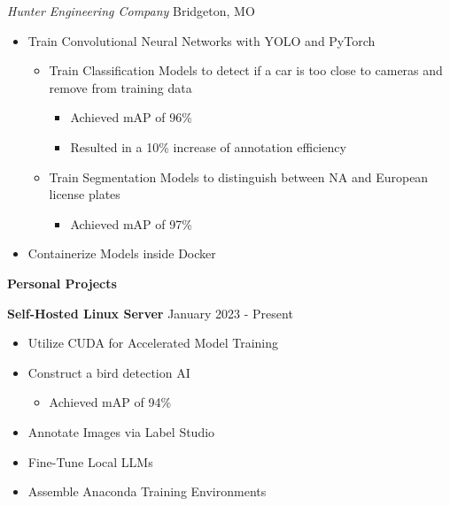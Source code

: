 \documentclass[11pt]{article}
\begin{document}
\textsl{Hunter Engineering Company} \hfill Bridgeton, MO
\begin{itemize}[noitemsep, topsep=0pt, partopsep=0pt, parsep=0pt, itemsep=0pt]
    \item Train Convolutional Neural Networks with YOLO and PyTorch
    \begin{itemize}[noitemsep, topsep=0pt, partopsep=0pt, parsep=0pt, itemsep=0pt]
        \item Train Classification Models to detect if a car is too close to cameras and remove from training data
        \begin{itemize}[noitemsep, topsep=0pt, partopsep=0pt, parsep=0pt, itemsep=0pt]
            \item Achieved mAP of 96\%
            \item Resulted in a 10\% increase of annotation efficiency
        \end{itemize}
        \item Train Segmentation Models to distinguish between NA and European license plates
        \begin{itemize}[noitemsep, topsep=0pt, partopsep=0pt, parsep=0pt, itemsep=0pt]
            \item Achieved mAP of 97\%
        \end{itemize}
    \end{itemize}
    \item Containerize Models inside Docker
\end{itemize}


\begin{center}
    \textbf{Personal Projects}
\end{center}

\textbf{Self-Hosted Linux Server} \hfill January 2023 - Present
\begin{itemize}[noitemsep, topsep=0pt, partopsep=0pt, parsep=0pt, itemsep=0pt]
    \item Utilize CUDA for Accelerated Model Training
    \item Construct a bird detection AI
    \begin{itemize}[noitemsep, topsep=0pt, partopsep=0pt, parsep=0pt, itemsep=0pt]
            \item Achieved mAP of 94\%
        \end{itemize}
    \item Annotate Images via Label Studio
    \item Fine-Tune Local LLMs
    \item Assemble Anaconda Training Environments
\end{itemize}
\end{document}
